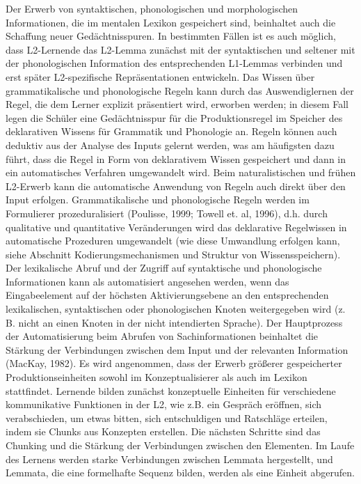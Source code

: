 \documentclass[
  letterpaper,
]{scrbook}
\begin{document}
Der Erwerb von syntaktischen, phonologischen und morphologischen
Informationen, die im mentalen Lexikon gespeichert sind, beinhaltet auch
die Schaffung neuer Gedächtnisspuren. In bestimmten Fällen ist es auch
möglich, dass L2-Lernende das L2-Lemma zunächst mit der syntaktischen
und seltener mit der phonologischen Information des entsprechenden
L1-Lemmas verbinden und erst später L2-spezifische Repräsentationen
entwickeln. Das Wissen über grammatikalische und phonologische Regeln
kann durch das Auswendiglernen der Regel, die dem Lerner explizit
präsentiert wird, erworben werden; in diesem Fall legen die Schüler eine
Gedächtnisspur für die Produktionsregel im Speicher des deklarativen
Wissens für Grammatik und Phonologie an. Regeln können auch deduktiv aus
der Analyse des Inputs gelernt werden, was am häufigsten dazu führt,
dass die Regel in Form von deklarativem Wissen gespeichert und dann in
ein automatisches Verfahren umgewandelt wird. Beim naturalistischen und
frühen L2-Erwerb kann die automatische Anwendung von Regeln auch direkt
über den Input erfolgen. Grammatikalische und phonologische Regeln
werden im Formulierer prozeduralisiert (Poulisse, 1999; Towell et. al,
1996), d.h. durch qualitative und quantitative Veränderungen wird das
deklarative Regelwissen in automatische Prozeduren umgewandelt (wie
diese Umwandlung erfolgen kann, siehe Abschnitt Kodierungsmechanismen
und Struktur von Wissensspeichern). Der lexikalische Abruf und der
Zugriff auf syntaktische und phonologische Informationen kann als
automatisiert angesehen werden, wenn das Eingabeelement auf der höchsten
Aktivierungsebene an den entsprechenden lexikalischen, syntaktischen
oder phonologischen Knoten weitergegeben wird (z. B. nicht an einen
Knoten in der nicht intendierten Sprache). Der Hauptprozess der
Automatisierung beim Abrufen von Sachinformationen beinhaltet die
Stärkung der Verbindungen zwischen dem Input und der relevanten
Information (MacKay, 1982). Es wird angenommen, dass der Erwerb größerer
gespeicherter Produktionseinheiten sowohl im Konzeptualisierer als auch
im Lexikon stattfindet. Lernende bilden zunächst konzeptuelle Einheiten
für verschiedene kommunikative Funktionen in der L2, wie z.B. ein
Gespräch eröffnen, sich verabschieden, um etwas bitten, sich
entschuldigen und Ratschläge erteilen, indem sie Chunks aus Konzepten
erstellen. Die nächsten Schritte sind das Chunking und die Stärkung der
Verbindungen zwischen den Elementen. Im Laufe des Lernens werden starke
Verbindungen zwischen Lemmata hergestellt, und Lemmata, die eine
formelhafte Sequenz bilden, werden als eine Einheit abgerufen.
\end{document}
